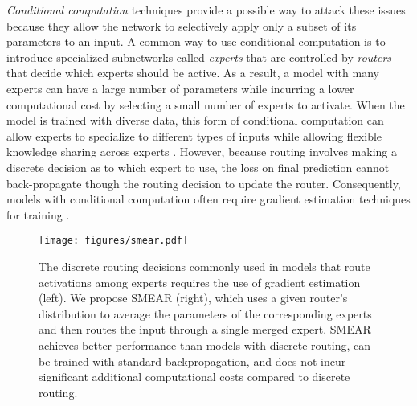 \documentclass{article}
\theoremstyle{plain}
\theoremstyle{definition}
\theoremstyle{remark}
\begin{document}


\textit{Conditional computation} techniques provide a possible way to attack these issues because they allow the network to selectively apply only a subset of its parameters to an input.
A common way to use conditional computation is to introduce specialized subnetworks called \textit{experts} that are controlled by \textit{routers} that decide which experts should be active.
As a result, a model with many experts can have a large number of parameters while incurring a lower computational cost by selecting a small number of experts to activate.
When the model is trained with diverse data, this form of conditional computation can allow experts to specialize to different types of inputs while allowing flexible knowledge sharing across experts \citep{ma2019snr}.
However, because routing involves making a discrete decision as to which expert to use, the loss on final prediction cannot back-propagate though the routing decision to update the router. 
Consequently, models with conditional computation often require gradient estimation techniques for training \citep{jang2016categorical, clark2022unified, fedus2021switch, bengio2013estimating}.

\begin{figure*}
\centering
{\texttt{[image: figures/smear.pdf]}\label{fig:smear_vs_cc}}
\caption{The discrete routing decisions commonly used in models that route activations among experts requires the use of gradient estimation (left). We propose SMEAR (right), which uses a given router's distribution to average the parameters of the corresponding experts and then routes the input through a single merged expert. SMEAR achieves better performance than models with discrete routing, can be trained with standard backpropagation, and does not incur significant additional computational costs compared to discrete routing.}\label{fig:smear_vs_cc}
\end{figure*}
\end{document}
